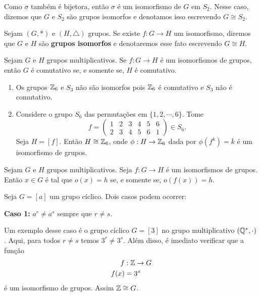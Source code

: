 \vspace{.3cm}

Como $\sigma$ também é bijetora, então $\sigma$ é um isomorfismo de $G$ em $S_2$. Nesse caso, dizemos que $G$ e $S_2$ são grupos isomorfos e denotamos isso escrevendo $G \cong S_2$.

\begin{definicao}
    Sejam $(G, *)$ e $(H, \triangle)$ grupos. Se existe $f : G \to H$ um isomorfismo, diremos que $G$ e $H$ são \textbf{grupos isomorfos} e denotaremos esse fato escrevendo $G \cong H$.
\end{definicao}

\begin{proposicao}
    Sejam $G$ e $H$ grupos multiplicativos. Se $f : G \to H$ é um isomorfismos de grupos, então $G$ é comutativo se, e somente se, $H$ é comutativo.
\end{proposicao}

\begin{exemplos}
    \begin{enumerate}[label={\arabic*})]
        \item Os grupos $\mathbb{Z}_6$ e $S_3$ não são isomorfos pois $\mathbb{Z}_6$ é comutativo e $S_3$ não é comutativo.

        \item Considere o grupo $S_6$ das permutações em $\{1, 2, \cdots, 6\}$. Tome
        \[
            f = \begin{pmatrix}
                1 & 2 & 3 & 4 & 5 & 6\\
                2 & 3 & 4 & 5 & 6 & 1
            \end{pmatrix} \in S_6.
        \]
        Seja $H = [f]$. Então $H \cong \mathbb{Z}_6$, onde $\phi : H \to \mathbb{Z}_6$ dada por $\phi(f^k) = \overline{k}$ é um isomorfismo de grupos.
    \end{enumerate}
\end{exemplos}

\begin{proposicao}
    Sejam $G$ e $H$ grupos multiplicativos. Seja $f : G \to H$ é um isomorfismos de grupos. Então $x \in G$ é tal que $o(x) = h$ se, e somente se, $o(f(x)) = h$.
\end{proposicao}

Seja $G = [a]$ um grupo cíclico. Dois casos podem ocorrer:

\textbf{Caso 1:} $a^r \ne a^s$ sempre que $r \ne s$.

Um exemplo desse caso é o grupo cíclico $G = [3]$ no grupo multiplicativo $(\mathbb{Q}^*, \cdot)$. Aqui, para todos $r \ne s$ temos $3^r \ne 3^s$. Além disso, é imediato verificar que a função
\begin{align*}
    f &: \mathbb{Z} \to G\\
    f(x) &= 3^x
\end{align*}
é um isomorfismo de grupos. Assim $\mathbb{Z} \cong G$.

